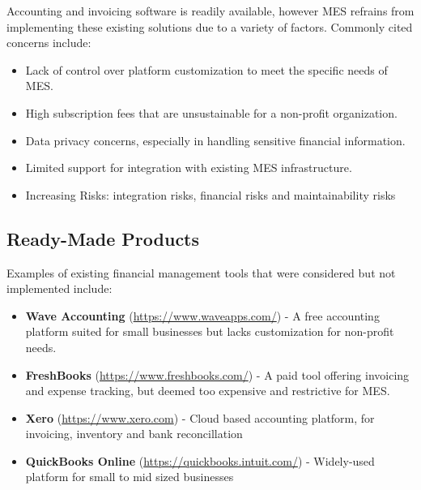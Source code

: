 \documentclass[12pt]{article}
\begin{document}
Accounting and invoicing software is readily available, however MES refrains from implementing these existing solutions due to a variety of factors. Commonly cited concerns include:
\begin{itemize}
    \item Lack of control over platform customization to meet the specific needs of MES.
    \item High subscription fees that are unsustainable for a non-profit organization.
    \item Data privacy concerns, especially in handling sensitive financial information.
    \item Limited support for integration with existing MES infrastructure.
    \item Increasing Risks: integration risks, financial risks and maintainability risks
\end{itemize}



\subsection{Ready-Made Products}

Examples of existing financial management tools that were considered but not implemented include:
\begin{itemize}
    \item \textbf{Wave Accounting} (\href{https://www.waveapps.com/}{https://www.waveapps.com/}) - A free accounting platform suited for small businesses but lacks customization for non-profit needs.
    \item \textbf{FreshBooks} (\href{https://www.freshbooks.com/}{https://www.freshbooks.com/}) - A paid tool offering invoicing and expense tracking, but deemed too expensive and restrictive for MES.
    \item \textbf{Xero} (\href{https://www.xero.com}{https://www.xero.com}) - Cloud based accounting platform, for invoicing, inventory and bank reconcillation
    \item \textbf{QuickBooks Online} (\href{https://quickbooks.intuit.com/}{https://quickbooks.intuit.com/}) - Widely-used platform for small to mid sized businesses

\end{itemize}
\end{document}
